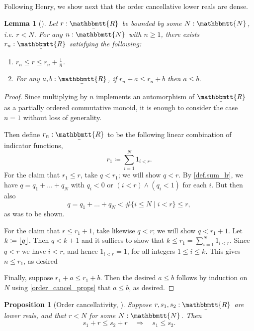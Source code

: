 \documentclass[reqno,11pt]{amsproc}
\theoremstyle{plain}
\newtheorem{proposition}[theorem]{Proposition}
\newtheorem{lemma}[theorem]{Lemma}
\theoremstyle{definition}
\DeclarePairedDelimiter{\floor}{\lfloor}{\rfloor}
\newcommand{\ubar}[1]{\underaccent{\bar}{#1}}
\newcommand{\ind}[1]{1_{#1}}			%
\newcommand{\internal}[1]{\raisebox{-.03ex}{$\mathbbmtt{#1}$}}
\newcommand{\hs}{\hspace{1pt}}
\newcommand{\tnn}{\internal{N}\hs}
\newcommand{\trr}{\internal{R}}
\newcommand{\tlrr}{\ubar{\trr}\hs}
\numberwithin{equation}{section}
\begin{document}
Following Henry, we show next that the order cancellative lower reals are dense.

\begin{lemma}[\cite{henry2012simplification}]
\label{cancellative_bounds}
	Let $r:\tlrr$ be bounded by some $N:\tnn$, i.e. $r<N$. For any $n:\tnn$ with $n\ge 1$, there exists $r_n:\tlrr$ satisfying the following:
	\begin{enumerate}
		\item $r_n\le r\le r_n + \frac{1}{n}$.
		\item For any $a,b:\tlrr$, if $r_n+a\le r_n+b$ then $a\le b$.
	\end{enumerate}
\end{lemma}

\begin{proof}
	Since multiplying by $n$ implements an automorphism of $\tlrr$ as a partially ordered commutative monoid, it is enough to consider the case $n = 1$ without loss of generality.

	Then define $r_n:\tlrr$ to be the following linear combination of indicator functions,
	\begin{equation}
		\label{eqn.cancellative_bounds}
		r_1 \coloneqq \sum_{i=1}^{N} \ind{i < r}.
	\end{equation}
	For the claim that $r_1\le r$, take $q < r_1$; we will show $q < r$. By \cref{def.sum_lr}, we have $q = q_1 + \ldots + q_N$ with $q_i < 0$ or $(i < r) \land (q_i < 1)$ for each $i$. But then also
	\[
		q = q_1 + \ldots + q_N < \#\{ i \le N \mid i < r \} \le r,
	\]
	as was to be shown.

	For the claim that $r\le r_1+1$, take likewise $q<r$; we will show $q < r_1 + 1$. Let $k \coloneqq \floor{q}$.  Then $q < k + 1$ and it suffices to show that $k \le r_1 = \sum_{i=1}^{N} \ind{i < r}$. Since $q < r$ we have $i < r$, and hence $\ind{i < r} = 1$, for all integers $1\le i\le k$. This gives $n\le r_1$, as desired

	Finally, suppose $r_1 + a \le r_1 + b$. Then the desired $a \le b$ follows by induction on $N$ using \cref{order_cancel_props} that $a\le b$, as desired.
\end{proof}

\begin{proposition}[Order cancellativity, \cite{henry2012simplification}]\label{cor.order_cancel}
	Suppose $r,s_1,s_2:\tlrr$ are lower reals, and that $r<N$ for some $N:\tnn$. Then
	\[
		s_1 + r \le s_2 + r \quad \Longrightarrow \quad s_1 \le s_2.
	\]
\end{proposition}
\end{document}
